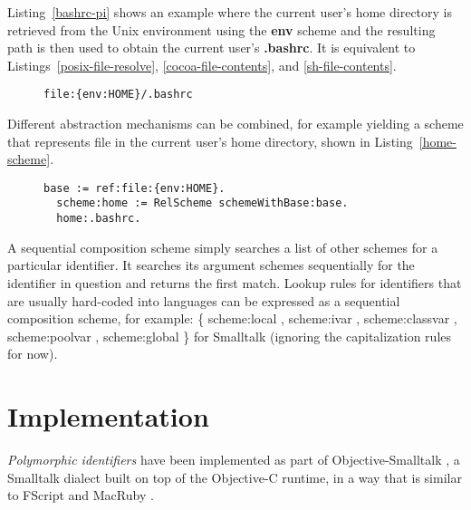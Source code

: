 \documentclass[preprint,authoryear]{acm_proc_article-sp}
\begin{document}
Listing~\ref{bashrc-pi} shows an example where the current user's home directory
is retrieved from the Unix environment using the {\bf env} scheme and the resulting
path is then used to obtain the current user's  {\bf .bashrc}.
It is equivalent to Listings~\ref{posix-file-resolve}, \ref{cocoa-file-contents}, and 
\ref{sh-file-contents}.

\begin{figure}[htbp]
\begin{lstlisting}[style=L,label=bashrc-pi,caption=Parametrized identifier.]
  file:{env:HOME}/.bashrc
\end{lstlisting}
\end{figure}


Different abstraction mechanisms can be combined, for example yielding
a scheme that represents file in the current user's home directory, shown
in Listing~\ref{home-scheme}.


\begin{figure}[htbp]
\begin{lstlisting}[style=L,label=home-scheme,caption=Accessing .bashrc via custom home: scheme.]
  base := ref:file:{env:HOME}.
  scheme:home := RelScheme schemeWithBase:base.
  home:.bashrc.
\end{lstlisting}
\end{figure}

A sequential composition scheme simply searches a list of other schemes
for a particular identifier.  It searches its argument schemes sequentially
for the identifier in question and returns the first match.  Lookup rules for
identifiers that are usually hard-coded into languages can be expressed
as a sequential composition scheme, for example:   \{ scheme:local ,
scheme:ivar , scheme:classvar , scheme:poolvar , scheme:global \} for Smalltalk 
(ignoring the capitalization rules for now).




\section{Implementation}
\label{implementation}

\emph{Polymorphic identifiers} have been implemented as part of Objective-Smalltalk \cite{objst},
a Smalltalk dialect built on top of the Objective-C\cite{objc-evol}\cite{objc-apple} runtime, 
in a way that is similar to FScript\cite{fscript} and MacRuby \cite{macruby}.
\end{document}
